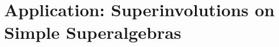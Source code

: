 


\section{Application: Superinvolutions on Simple Superalgebras}\label{ssec:simple-sa-but-with-vphi}

